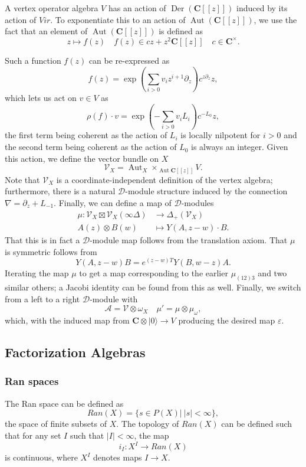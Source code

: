\documentclass{article}
\newcommand{\CC}{\mathbold{C}}
\newcommand{\vac}{|0\rangle}
\newcommand{\Dd}{\mathcal{D}}
\newcommand{\Aa}{\mathcal{A}}
\newcommand{\Vv}{\mathcal{V}}
\DeclareMathOperator{\Aut}{Aut}
\DeclareMathOperator{\Der}{Der}
\begin{document}
A vertex operator algebra $V$ has an action of $\Der(\CC[[z]])$ induced by its action of $Vir$.  To exponentiate this to an action of $\Aut(\CC[[z]])$, we use the fact that an element of $\Aut(\CC[[z]])$ is defined as
\[z \mapsto f(z) \quad f(z)\in cz+z^2\CC[[z]] \quad c \in \CC^\times. \]

Such a function $f(z)$ can be re-expressed as
\[f(z)=\exp{ \left(\sum_{i>0}v_iz^{i+1}\partial_z \right)} c^{z\partial_z}z, \]
which lets us act on $v \in V$ as
\[\rho(f) \cdot v=\exp{ \left(-\sum_{i>0}v_iL_i \right)}c^{-L_0}z, \]
the first term being coherent as the action of $L_i$ is locally nilpotent for $i>0$ and the second term being coherent as the action of $L_0$ is always an integer.  Given this action, we define the vector bundle on $X$
\[\Vv_X=\Aut_X \times_{\Aut \CC[[z]]} V. \]
Note that $\Vv_X$ is a coordinate-independent definition of the vertex algebra; furthermore, there is a natural $\Dd$-module structure induced by the connection $\nabla = \partial_z + L_{-1}$.  Finally, we can define a map of $\Dd$-modules
\begin{align}
  \mu: \Vv_X \boxtimes \Vv_X (\infty \Delta) &\rightarrow \Delta_+(\Vv_X)\\
  A(z) \otimes B(w) &\mapsto Y(A,z-w)\cdot B.
\end{align}
That this is in fact a $\Dd$-module map follows from the translation axiom.  That $\mu$ is symmetric follows from
\[Y(A,z-w)B=e^{(z-w)T}Y(B,w-z)A. \]
Iterating the map $\mu$ to get a map corresponding to the earlier $\mu_{(12)3}$ and two similar others; a Jacobi identity can be found from this as well.  Finally, we switch from a left to a right $\Dd$-module with
\[\Aa = \Vv \otimes \omega_X \quad \mu' = \mu \otimes \mu_\omega, \]
which, with the induced map from $\CC \otimes \vac \rightarrow V$ producing the desired map $\varepsilon$.
\subsection{Factorization Algebras}

\subsubsection{Ran spaces}
The Ran space can be defined as
\[Ran(X) = \{s \in P(X) | \ |s|<\infty \}, \]
the space of finite subsets of $X$.  The topology of $Ran(X)$ can be defined such that for any set $I$ such that $|I|<\infty$, the map
\[i_I: X^I \rightarrow Ran(X) \]
is continuous, where $X^I$ denotes maps $I \rightarrow X$.
\end{document}
